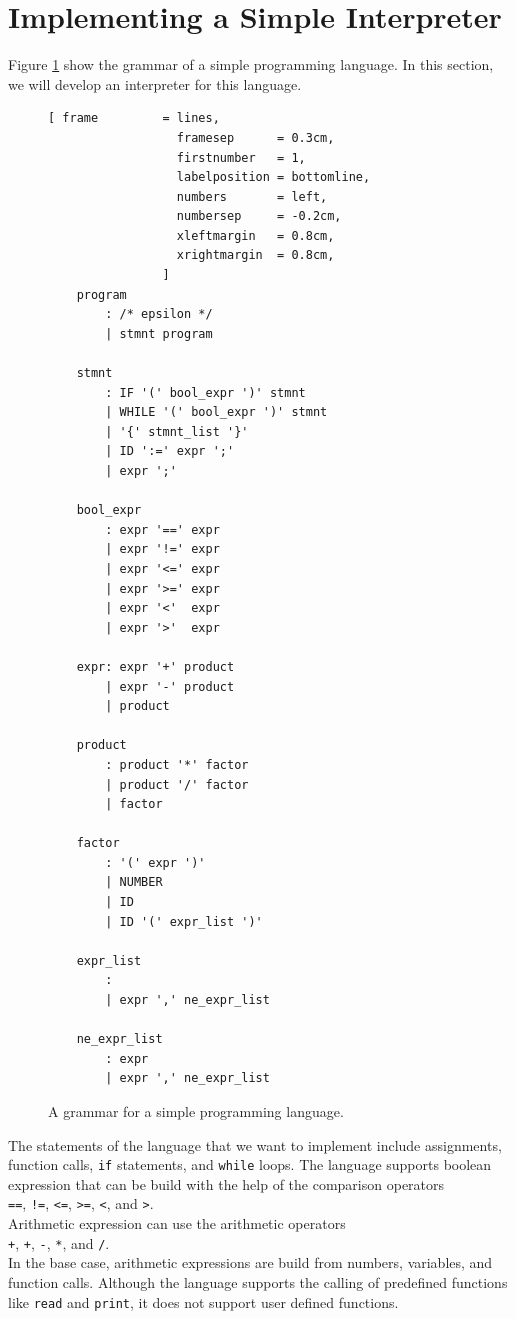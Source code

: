 \section{Implementing a Simple Interpreter  \label{chapter:interpreter}}
Figure \ref{fig:Pure.g} show the grammar of a simple programming language.  In this section, we will develop an
interpreter for this language.

\begin{figure}[!ht]
\centering
\begin{Verbatim}[ frame         = lines, 
                  framesep      = 0.3cm, 
                  firstnumber   = 1,
                  labelposition = bottomline,
                  numbers       = left,
                  numbersep     = -0.2cm,
                  xleftmargin   = 0.8cm,
                  xrightmargin  = 0.8cm,
                ]
    program
        : /* epsilon */
        | stmnt program
        
    stmnt 
        : IF '(' bool_expr ')' stmnt                 
        | WHILE '(' bool_expr ')' stmnt
        | '{' stmnt_list '}' 
        | ID ':=' expr ';'  
        | expr ';'       
    
    bool_expr 
        : expr '==' expr     
        | expr '!=' expr     
        | expr '<=' expr     
        | expr '>=' expr     
        | expr '<'  expr      
        | expr '>'  expr     
     
    expr: expr '+' product                 
        | expr '-' product
        | product
                  
    product
        : product '*' factor               
        | product '/' factor 
        | factor
    
    factor
        : '(' expr ')' 
        | NUMBER
        | ID
        | ID '(' expr_list ')'
    
    expr_list
        :
        | expr ',' ne_expr_list
    
    ne_expr_list
        : expr
        | expr ',' ne_expr_list
\end{Verbatim}
\vspace*{-0.3cm}
\caption{A grammar for a simple programming language.}
\label{fig:Pure.g}
\end{figure}

The statements of the language that we want to implement include assignments, function calls,
\texttt{if} statements, and \texttt{while} loops.  The language supports boolean expression that can be build
with the help of the comparison operators
\\[0.2cm]
\hspace*{1.3cm}
\texttt{==}, \texttt{!=}, \texttt{<=}, \texttt{>=}, \texttt{<}, and \texttt{>}.
\\[0.2cm]
Arithmetic expression can use the arithmetic operators 
\\[0.2cm]
\hspace*{1.3cm}
\texttt{+}, \texttt{+}, \texttt{-}, \texttt{*}, and \texttt{/}.
\\[0.2cm]
In the base case, arithmetic expressions are build from numbers, variables, and function calls.
Although the language supports the calling of predefined functions like \texttt{read} and \texttt{print},
it does not support user defined functions.

